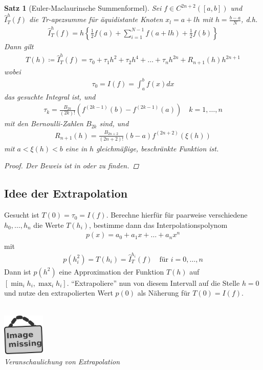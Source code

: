 \documentclass[ngerman,fontsize=11pt, paper=a4, parskip=half, titlepage=true, toc=bib]{scrbook}
\theoremstyle{definition}
\theoremstyle{plain}
\newtheorem{Satz}[Def]{Satz}		%
\newcommand{\subsectione}[1]{\addtocounter{Def}{1}\subsection{#1}}
\newenvironment{Satze}[1][]{ %
  \begin{Satz}[#1]  }
  { \end{Satz}
  \addtocounter{subsection}{1}}
\newcommand{\imagemissing}[1]{
  \begin{center}~\\
    \centering 
    \includegraphics[width=2cm]{images/image_missing.jpg}\\
    \textit{#1} \\
  \end{center}
}
\begin{document}
\begin{Satze}[Euler-Maclaurinsche
  Summenformel]
  Sei $f\in C^{2n+2}([a,b])$ und 
  $\hat{I}_T^h(f)$ die Tr-apezsumme
  für äquidistante Knoten $x_l=a+lh$
  mit $h=\frac{b-a}{N}$, d.h.
\begin{gather}
  \hat{I}_T^h(f) = h\left\{
    \frac{1}{2}f(a) + \sum_{i=1}^{N-1}f(a+lh) +
  \frac{1}{2}f(b)
\right\}
\label{VII.3.1}
\end{gather}
Dann gilt
\begin{gather}
  T(h) \coloneqq \hat{I}_T^h(f) = \tau_0+\tau_1h^2+\tau_2h^4
  +\ldots + \tau_nh^{2n}+ R_{n+1}(h)h^{2n+1}
\end{gather}
wobei
\begin{gather}
  \tau_0 = I(f) = \int_a^bf(x)dx
\label{VII.3.3}
\end{gather}
das gesuchte Integral ist, und
\begin{gather*}
  \tau_k = \frac{B_{2k}}{(2k)!}
  \left(f^{(2k-1)}(b)-f^{(2k-1)}(a)\right)
  \quad k=1,\ldots, n
\end{gather*}
mit den Bernoulli-Zahlen $B_{2k}$ sind, und
\begin{gather*}
  R_{n+1}(h) =
  \frac{B_{2n+2}}{(2n+2)!}(b-a)f^{(2n+2)}(\xi(h))
\end{gather*}
mit $a<\xi(h)<b$ eine in $h$
gleichmäßige, beschränkte Funktion
ist.

\begin{proof}
  Der Beweis ist in
  \cite{stoerbulirsch} 
  oder \cite{haemmerlinhoffmann} zu finden.
\end{proof}
\end{Satze}

\subsectione{Idee der Extrapolation}
Gesucht ist $T(0)= \tau_0=I(f)$.
Berechne hierfür für paarweise
verschiedene 
$h_0,\ldots, h_n$ die Werte
$T(h_i)$,
bestimme dann das
Interpolationspolynom
\begin{gather}
  p(x) = a_0+a_1x+\ldots+a_nx^n
\label{VII.3.4}
\end{gather}
mit 
\begin{gather}
  p(h_i^2) =
  T(h_i)=\hat{I}_T^{h_i}(f)
\quad \text{für } i=0,\ldots,n
\label{VII.3.5}
\end{gather}
Dann ist $p(h^2)$ eine Approximation
der Funktion $T(h)$
auf $[\min_ih_i,\max_ih_i]$.
\enquote{Extrapoliere} nun von
diesem Intervall
auf die Stelle $h=0$ und nutze
den extrapolierten Wert $p(0)$ als
Näherung für $T(0)=I(f)$.

\imagemissing{Veranschaulichung von Extrapolation}


\nocite{*} %
\backmatter		%


\printindex		%

\printbibliography	%
\end{document}
